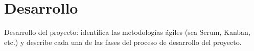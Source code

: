 \chapter{Desarrollo}
Desarrollo del proyecto: identifica las metodologías ágiles (sea Scrum, Kanban, etc.) y describe cada una de las fases del proceso de desarrollo del proyecto. 